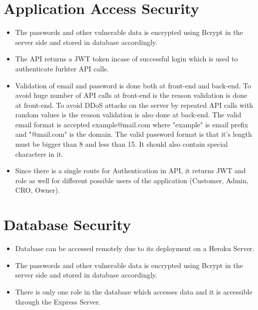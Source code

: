 \section{Application Access Security}
\begin{itemize}
    \item The passwords and other vulnerable data is encrypted using Bcrypt in the server side and stored in database accordingly.
    \item The API returns a JWT token incase of successful login which is used to authenticate furhter API calls.
    \item Validation of email and password is done both at front-end and back-end. To avoid huge number of API calls at front-end is the reason validation is done at front-end. To avoid DDoS attacks on the server by repeated API calls with random values is the reason validation is also done at back-end. The valid email format is accepted example@mail.com where "example" is email prefix and "@mail.com" is the domain. The valid password format is that it's length must be bigger than 8 and less than 15. It should also contain special characters in it.
    \item Since there is a single route for Authentication in API, it returns JWT and role as well for different possible users of the application (Customer, Admin, CRO, Owner).
\end{itemize}
\section{Database Security}
\begin{itemize}
    \item Database can be accessed remotely due to its deployment on a Heroku Server.
    \item The passwords and other vulnerable data is encrypted using Bcrypt in the server side and stored in database accordingly.
    \item There is only one role in the database which accesses data and it is accessible through the Express Server.
\end{itemize}